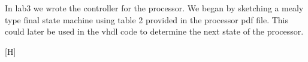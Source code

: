


In lab3 we wrote the controller for the processor. We began by sketching a mealy
type final state machine using table 2 provided in the processor pdf file. This
could later be used in the vhdl code to determine the next state of the
processor. 

[H]